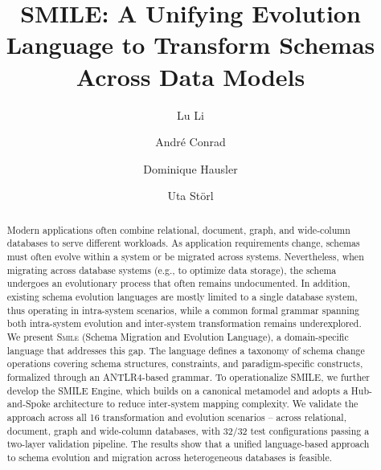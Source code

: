 \documentclass{llncs}
\begin{document}
\title{
SMILE: A Unifying Evolution Language to Transform Schemas Across Data Models
}

\author{Lu Li\orcidID{} \and Andr\'e Conrad \and Dominique Hausler \and Uta St\"orl}



\maketitle




\begin{abstract}
  Modern applications often combine relational, document, graph, and wide-column databases to serve different workloads.
  As application requirements change, schemas must often evolve within a system or be migrated across systems. Nevertheless, when migrating across database systems (e.g., to optimize data storage), the schema undergoes an evolutionary process that often remains undocumented. In addition, existing schema evolution languages are mostly limited to a single database system, thus operating in intra-system scenarios, while a common formal grammar spanning both intra-system evolution and inter-system transformation remains underexplored.
  We present \textsc{Smile} (Schema Migration and Evolution Language), a domain-specific language that addresses this gap.
  The language defines a taxonomy of schema change operations covering schema structures, constraints, and paradigm-specific constructs, formalized through an ANTLR4-based grammar.
  To operationalize SMILE, we further develop the SMILE Engine, which builds on a canonical metamodel and adopts a Hub-and-Spoke architecture to reduce inter-system mapping complexity.
  We validate the approach across all 16 transformation and evolution scenarios -- across relational, document, graph and wide-column databases, with 32/32 test configurations passing a two-layer validation pipeline.
  The results show that a unified language-based approach to schema evolution and migration across heterogeneous databases is feasible.

\end{abstract}
\end{document}
